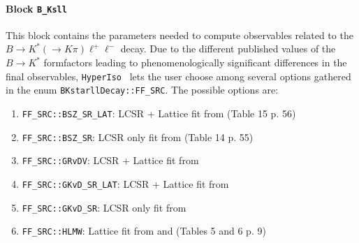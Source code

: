 \documentclass[preprint,11pt]{elsarticle}
\newcommand{\hi}{\texttt{HyperIso}}
\begin{document}
\paragraph{Block \texttt{B\_Ksll}}
This block contains the parameters needed to compute observables related to the $B\to K^*(\to K\pi)\ell^+\ell^-$ decay. Due to the different published values of the $B\to K^*$ formfactors leading to phenomenologically significant differences in the final observables, \hi~ lets the user choose among several options gathered in the enum \texttt{BKstarllDecay::FF\_SRC}. The possible options are:
\begin{enumerate}[label=$\diamond$]
    \item \texttt{FF\_SRC::BSZ\_SR\_LAT}: LCSR + Lattice fit from \cite{Bharucha:2015bzk} (Table 15 p. 56)
    \item \texttt{FF\_SRC::BSZ\_SR}: LCSR only fit from \cite{Bharucha:2015bzk} (Table 14 p. 55)
    \item \texttt{FF\_SRC::GRvDV}: LCSR + Lattice fit from \cite{Gubernari:2023puw}
    \item \texttt{FF\_SRC::GKvD\_SR\_LAT}: LCSR + Lattice fit from \cite{Gubernari:2018wyi}
    \item \texttt{FF\_SRC::GKvD\_SR}: LCSR only fit from \cite{Gubernari:2018wyi}
    \item \texttt{FF\_SRC::HLMW}: Lattice fit from \cite{Horgan:2013hoa} and \cite{Horgan:2015vla} (Tables 5 and 6 p. 9)
\end{enumerate}
\end{document}
